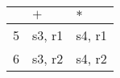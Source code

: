 \documentclass{standalone}
\providecommand\lightrule{%
	\arrayrulecolor{black!30}%
	\midrule[\lightrulewidth]%
	\arrayrulecolor{black}}
\begin{document}
\begin{tabularx}{\textwidth}{XXX}
    & \(+\) & \(\ast\) \\
    \midrule
        5
        &
        s3, r1
        &
        s4, r1
        \\ \lightrule

        6
        &
        s3, r2
        &
        s4, r2
        \\
\end{tabularx}
\end{document}
